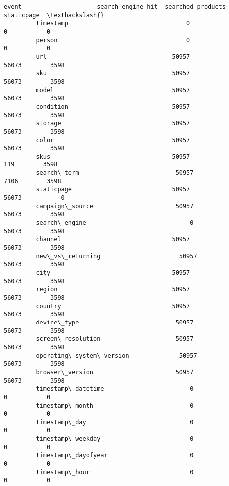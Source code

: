 \documentclass[11pt]{article}
\begin{document}
\begin{Verbatim}[commandchars=\\\{\}]
         event                     search engine hit  searched products  staticpage  \textbackslash{}
         timestamp                                 0                  0           0   
         person                                    0                  0           0   
         url                                   50957              56073        3598   
         sku                                   50957              56073        3598   
         model                                 50957              56073        3598   
         condition                             50957              56073        3598   
         storage                               50957              56073        3598   
         color                                 50957              56073        3598   
         skus                                  50957                119        3598   
         search\_term                           50957               7106        3598   
         staticpage                            50957              56073           0   
         campaign\_source                       50957              56073        3598   
         search\_engine                             0              56073        3598   
         channel                               50957              56073        3598   
         new\_vs\_returning                      50957              56073        3598   
         city                                  50957              56073        3598   
         region                                50957              56073        3598   
         country                               50957              56073        3598   
         device\_type                           50957              56073        3598   
         screen\_resolution                     50957              56073        3598   
         operating\_system\_version              50957              56073        3598   
         browser\_version                       50957              56073        3598   
         timestamp\_datetime                        0                  0           0   
         timestamp\_month                           0                  0           0   
         timestamp\_day                             0                  0           0   
         timestamp\_weekday                         0                  0           0   
         timestamp\_dayofyear                       0                  0           0   
         timestamp\_hour                            0                  0           0   
         

\end{Verbatim}
\end{document}
